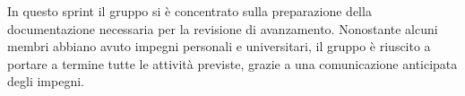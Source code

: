 In questo sprint il gruppo si è concentrato sulla preparazione della documentazione necessaria per la revisione
di avanzamento.
Nonostante alcuni membri abbiano avuto impegni personali e universitari, il gruppo è riuscito a portare a termine
tutte le attività previste, grazie a una comunicazione anticipata degli impegni.\\


%
%
